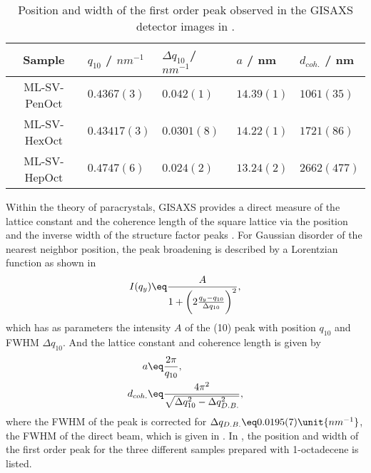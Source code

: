 \documentclass[\main/dresen_thesis.tex]{subfiles}
\begin{document}
    \begin{table}[tb]
      \centering
      \caption{\label{tab:monolayers:solventProperties:GisaxsLatticeParams}Position and width of the first order peak observed in the GISAXS detector images in .}
      \begin{tabular}{ c || l | l || l | l }
        Sample  & $q_{10}$ / $\unit{nm^{-1}}$ & $\Delta q_{10}$ / $nm^{-1}$ & $a$ / nm & $d_{coh.}$ / nm \\
        \hline
        ML-SV-PenOct
          & $0.4367(3)$
          & $0.042(1)$
          & $14.39(1)$
          & $1061(35)$\\
        ML-SV-HexOct
          & $0.43417(3)$
          & $0.0301(8)$
          & $14.22(1)$
          & $1721(86)$\\
        ML-SV-HepOct
          & $0.4747(6)$
          & $0.024(2)$
          & $13.24(2)$
          & $2662(477)$\\
        \hline
      \end{tabular}
    \end{table}

    Within the theory of paracrystals, GISAXS provides a direct measure of the lattice constant and the coherence length of the square lattice via the position and the inverse width of the structure factor peaks \cite{Renaud_2009_Probi}.
    For Gaussian disorder of the nearest neighbor position, the peak broadening is described by a Lorentzian function as shown in 
    \begin{align}
      I(q_y) \eq \frac{A} {1 + \biggl(2\frac{q_y - q_{10}}{\Delta q_{10}}\biggr)^2},
    \end{align}
    which has as parameters the intensity $A$ of the (10) peak with position $q_{10}$ and FWHM $\Delta q_{10}$.
    And the lattice constant and coherence length is given by
    \begin{align}
      a &\eq \frac{2 \pi}{q_{10}}, \\
      d_{coh.} &\eq \frac{4 \pi^2}{\sqrt{ \Delta q_{10}^2 - \Delta q_{D.B.}^2 }},
    \end{align}
    where the FWHM of the peak is corrected for $\Delta q_{D.B.} \eq 0.0195(7) \unit{nm^{-1}}$, the FWHM of the direct beam, which is given in .
    In , the position and width of the first order peak for the three different samples prepared with 1-octadecene is listed.
\end{document}
